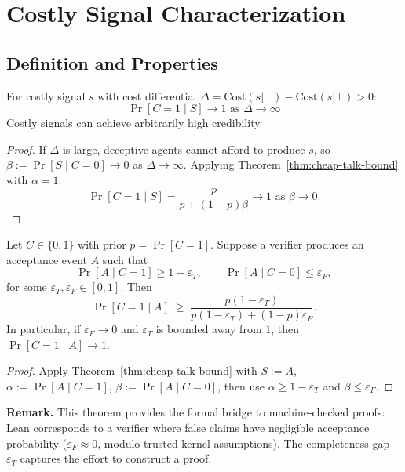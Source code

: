 \section{Costly Signal
Characterization}\label{costly-signal-characterization}

\subsection{Definition and Properties}\label{definition-and-properties}

\begin{theorem}\label{thm:costly-signal}
For costly signal $s$ with cost differential
$\Delta = \text{Cost}(s | \bot) - \text{Cost}(s | \top) > 0$:
\[\Pr[C=1 \mid S] \to 1 \text{ as } \Delta \to \infty\]
Costly signals can achieve arbitrarily high credibility.

 
\end{theorem}

\begin{proof}
If $\Delta$ is large, deceptive agents cannot afford to produce $s$,
so $\beta := \Pr[S \mid C=0] \to 0$ as $\Delta \to \infty$.
Applying Theorem~\ref{thm:cheap-talk-bound} with $\alpha = 1$:
\[
\Pr[C=1 \mid S] = \frac{p}{p + (1-p)\beta} \to 1 \text{ as } \beta \to 0.
\]
\end{proof}

\begin{theorem}\label{thm:verified-signal}
Let $C\in\{0,1\}$ with prior $p=\Pr[C=1]$. Suppose a verifier produces an
acceptance event $A$ such that
\[
\Pr[A \mid C=1]\ge 1-\varepsilon_T,\qquad \Pr[A \mid C=0]\le \varepsilon_F,
\]
for some $\varepsilon_T,\varepsilon_F\in[0,1]$.
Then
\[
\Pr[C=1 \mid A]
\;\ge\;
\frac{p(1-\varepsilon_T)}{p(1-\varepsilon_T) + (1-p)\varepsilon_F}.
\]
In particular, if $\varepsilon_F\to 0$ and $\varepsilon_T$ is bounded away from $1$,
then $\Pr[C=1\mid A]\to 1$.

 
\end{theorem}

\begin{proof}
Apply Theorem~\ref{thm:cheap-talk-bound} with $S:=A$, $\alpha:=\Pr[A\mid C=1]$,
$\beta:=\Pr[A\mid C=0]$, then use $\alpha\ge 1-\varepsilon_T$ and $\beta\le\varepsilon_F$.
\end{proof}

\textbf{Remark.} This theorem provides the formal bridge to machine-checked proofs:
Lean corresponds to a verifier where false claims have negligible acceptance probability
($\varepsilon_F \approx 0$, modulo trusted kernel assumptions). The completeness gap
$\varepsilon_T$ captures the effort to construct a proof.

